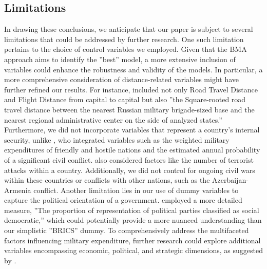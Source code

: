 \documentclass[12pt,a4paper]{article}
\begin{document}
\subsection{Limitations}
In drawing these conclusions, we anticipate that our paper is subject to several limitations that could be addressed by further research. One such limitation pertains to the choice of control variables we employed. Given that the BMA approach aims to identify the ''best'' model, a more extensive inclusion of variables could enhance the robustness and validity of the models. In particular, a more comprehensive consideration of distance-related variables might have further refined our results. For instance, \citet{kofrovn2023} included not only Road Travel Distance and Flight Distance from capital to capital but also ''the Square-rooted road travel distance between the nearest Russian military brigade-sized base and the nearest regional administrative center on the side of analyzed states.'' Furthermore, we did not incorporate variables that represent a country's internal security, unlike \citet{nordhaus2012}, who integrated variables such as the weighted military expenditures of friendly and hostile nations and the estimated annual probability of a significant civil conflict. \citet{kofrovn2023} also considered factors like the number of terrorist attacks within a country. Additionally, we did not control for ongoing civil wars within these countries or conflicts with other nations, such as the Azerbaijan-Armenia conflict. Another limitation lies in our use of dummy variables to capture the political orientation of a government. \citet{kofrovn2023} employed a more detailed measure, ''The proportion of representation of political parties classified as social democratic,'' which could potentially provide a more nuanced understanding than our simplistic ''BRICS'' dummy. To comprehensively address the multifaceted factors influencing military expenditure, further research could explore additional variables encompassing economic, political, and strategic dimensions, as suggested by \citet{nikolaidou2008}.\\
\end{document}
